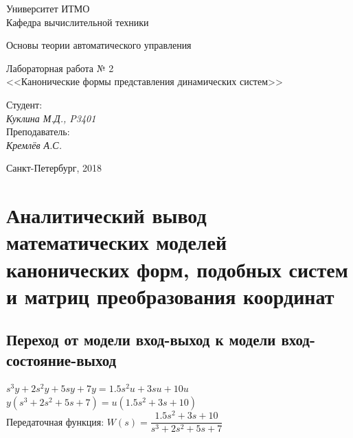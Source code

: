 \documentclass[12pt, a4paper] {ncc}
\begin{document}
\setcounter{figure}{0}
\frenchspacing
\pagestyle{empty}
\begin{center}
                            Университет ИТМО    \\
                        Кафедра вычислительной техники

			Основы теории автоматического управления
\end{center}
\begin{center}
			Лабораторная работа № 2 \\
		<<Канонические формы представления динамических систем>>
\end{center}
\begin{flushright}
                                    Студент:\\
                                    {\it Куклина М.Д., P3401}\\
                                    Преподаватель: \\
                                    {\it Кремлёв А.С.}
\end{flushright}
\begin{center}
                             Санкт-Петербург, 2018
\end{center}
\newpage


\section{Аналитический вывод математических моделей канонических форм, подобных систем и матриц преобразования координат}

	\subsection{Переход от модели вход-выход к модели вход-состояние-выход}
		$s^3 y + 2 s^2 y + 5 s y + 7 y = 1.5 s^2 u + 3 s u + 10 u$\\

		$y (s^3 + 2 s^2 + 5 s + 7) = u ( 1.5 s^2 + 3 s + 10)$\\

		Передаточная функция: $W(s) = \dfrac {1.5 s^2 + 3 s + 10} {s^3 + 2 s^2 + 5 s + 7}$
\end{document}
